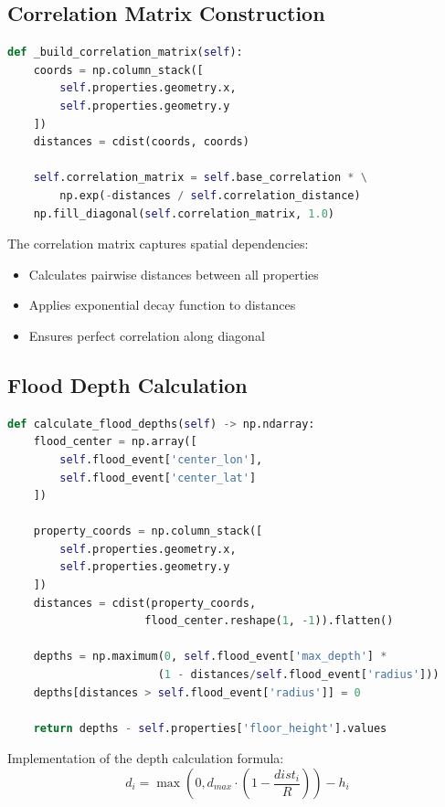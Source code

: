 \documentclass{article}
\begin{document}
\subsection{Correlation Matrix Construction}
\begin{lstlisting}[language=Python]
def _build_correlation_matrix(self):
    coords = np.column_stack([
        self.properties.geometry.x,
        self.properties.geometry.y
    ])
    distances = cdist(coords, coords)
    
    self.correlation_matrix = self.base_correlation * \
        np.exp(-distances / self.correlation_distance)
    np.fill_diagonal(self.correlation_matrix, 1.0)
\end{lstlisting}

The correlation matrix captures spatial dependencies:
\begin{itemize}
    \item Calculates pairwise distances between all properties
    \item Applies exponential decay function to distances
    \item Ensures perfect correlation along diagonal
\end{itemize}

\subsection{Flood Depth Calculation}
\begin{lstlisting}[language=Python]
def calculate_flood_depths(self) -> np.ndarray:
    flood_center = np.array([
        self.flood_event['center_lon'],
        self.flood_event['center_lat']
    ])
    
    property_coords = np.column_stack([
        self.properties.geometry.x,
        self.properties.geometry.y
    ])
    distances = cdist(property_coords, 
                     flood_center.reshape(1, -1)).flatten()
    
    depths = np.maximum(0, self.flood_event['max_depth'] * 
                       (1 - distances/self.flood_event['radius']))
    depths[distances > self.flood_event['radius']] = 0
    
    return depths - self.properties['floor_height'].values
\end{lstlisting}

Implementation of the depth calculation formula:
\begin{equation}
d_i = \max(0, d_{max} \cdot (1 - \frac{dist_i}{R})) - h_i
\end{equation}
\end{document}

